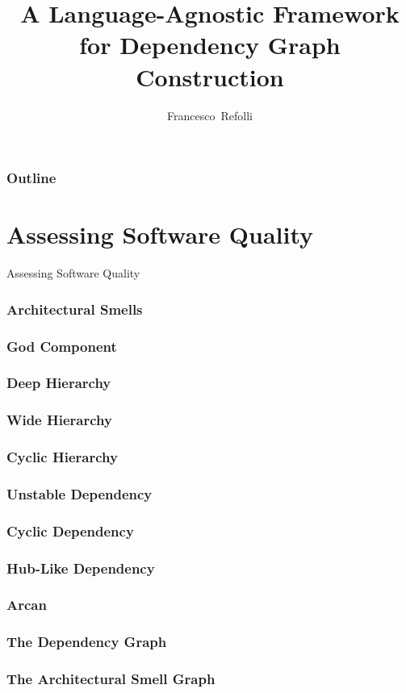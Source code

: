 \documentclass[dvipsnames, 10pt]{beamer}
\date[25 September 2025]{}
\title[TSD Seminary]{A Language-Agnostic Framework for Dependency Graph Construction}
\subtitle{}
\author[Francesco~Refolli]{Francesco~Refolli}
\begin{document}
\frame{\titlepage}

\begin{frame}
\frametitle{Outline}
\tableofcontents
\end{frame}


\section{Assessing Software Quality}
\begin{frame}
  \centering
  \Huge
  Assessing Software Quality
\end{frame}

\begin{frame}
  \frametitle{Architectural Smells}
\end{frame}

\begin{frame}
  \frametitle{God Component}
\end{frame}

\begin{frame}
  \frametitle{Deep Hierarchy}
\end{frame}

\begin{frame}
  \frametitle{Wide Hierarchy}
\end{frame}

\begin{frame}
  \frametitle{Cyclic Hierarchy}
\end{frame}

\begin{frame}
  \frametitle{Unstable Dependency}
\end{frame}

\begin{frame}
  \frametitle{Cyclic Dependency}
\end{frame}

\begin{frame}
  \frametitle{Hub-Like Dependency}
\end{frame}

\begin{frame}
  \frametitle{Arcan}
\end{frame}

\begin{frame}
  \frametitle{The Dependency Graph}
\end{frame}

\begin{frame}
  \frametitle{The Architectural Smell Graph}
\end{frame}
\end{document}
